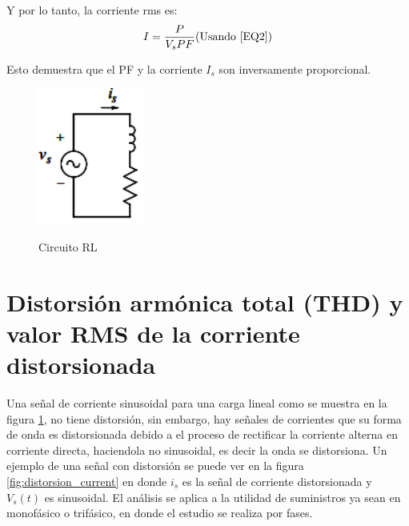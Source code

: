 Y por lo tanto, la corriente rms es:\\

\begin{equation}\label{EQ3}
I=\frac{P}{V_{s}PF}\\
$(Usando \ref{EQ2})$  \\
\end{equation} 

Esto demuestra que el PF y la corriente $I_{s}$ son inversamente proporcional. \\

\begin{figure}[H]
\centering
\includegraphics{2Marco/CargaRL}
\caption{ Circuito RL  } \cite{A29} 
\label{fig:RL}
\end{figure} 




\section{Distorsión armónica total (THD) y valor RMS de la corriente distorsionada}


Una señal de corriente sinusoidal para una carga lineal como se muestra en la figura \ref{fig:RL}, no tiene distorsión, sin embargo, hay señales de corrientes que su forma de onda es distorsionada debido a el proceso de rectificar la corriente alterna en corriente directa, haciendola no sinusoidal, es decir la onda se distorsiona. \cite{A29} Un ejemplo de una señal con distorsión se puede ver en la figura \ref{fig:distorsion_current} en donde $i_{s}$ es la señal de corriente distorsionada y $V_{s}(t)$ es sinusoidal. El análisis se aplica a la utilidad de suministros ya sean en monofásico o trifásico, en donde el estudio se realiza por fases.\\
  
